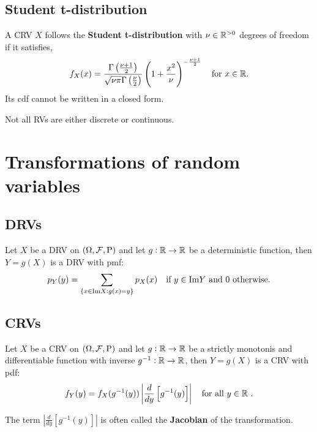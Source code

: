 \subsection{Student t-distribution}
\begin{definition}
    A CRV $X$ follows the \textbf{Student t-distribution} with $\nu\in\mathbb{R}^{>0}$ degrees of freedom if it satisfies, \[
        f_X(x) = \frac
        {\Gamma\left(\frac{\nu+1}{2}\right)}
        {\sqrt{\nu\pi}\Gamma\left(\frac{\nu}{2}\right)}
        \left(1 + \frac{x^2}{\nu}\right)^{-\frac{\nu+1}{2}}
        \quad
        \text{\textcolor{black}{for }$x\in\mathbb{R}$}\textcolor{black}{.}
    \]
    Its cdf cannot be written in a closed form.
\end{definition}
\begin{remark}
    Not all RVs are either discrete or continuous.
\end{remark}
\section{Transformations of random variables}
\subsection{DRVs}
\begingroup\belowdisplayskip=-10pt
\begin{theorem}
    Let $X$ be a DRV on $(\Omega,\mathcal{F},\mathrm{P})$ and let $g:\mathbb{R}\rightarrow\mathbb{R}$ be a deterministic function, then $Y=g(X)$ is a DRV with pmf: \[
    p_Y(y)=\sum_{\{x\in\text{Im}X:g(x)=y\}}p_X(x) \quad \text{\textcolor{black}{if }$y\in\text{Im}Y$ \textcolor{black}{and }0 \textcolor{black}{ otherwise.}}
    \]
\end{theorem}
\endgroup
\subsection{CRVs}
\begingroup\belowdisplayskip=-10pt
\begin{theorem}
    Let $X$ be a CRV on $(\Omega,\mathcal{F},\mathrm{P})$ and let $g:\mathbb{R}\rightarrow\mathbb{R}$ be a strictly monotonis and differentiable function with inverse $g^{-1}:\mathbb{R}\rightarrow\mathbb{R}$, then $Y=g(X)$ is a CRV with pdf: \[
    f_Y(y)=f_X(g^{-1}(y))\left|\frac{d}{dy}\left[g^{-1}(y)\right]\right| \quad \text{\textcolor{black}{for all }$y\in\mathbb{R}$ \textcolor{black}{.}}
    \]
\end{theorem}
\endgroup
\begin{remark}
    The term ${\displaystyle\left|\frac{d}{dy}\left[g^{-1}(y)\right]\right|}$ is often called the \textbf{Jacobian} of the transformation.
\end{remark}
